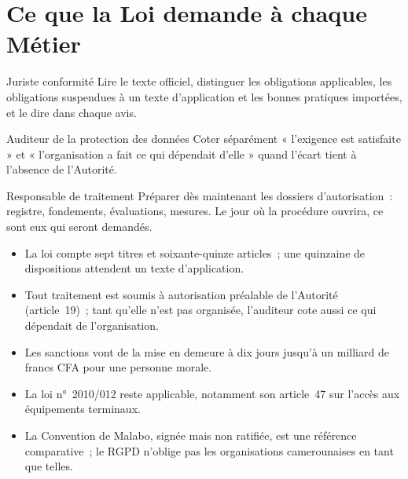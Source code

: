 \section{Ce que la Loi demande à chaque Métier}
\label{sec:c08-metiers}

\begin{boxmetier}{Juriste conformité}
Lire le texte officiel, distinguer les obligations applicables, les
obligations suspendues à un texte d'application et les bonnes pratiques
importées, et le dire dans chaque avis.
\end{boxmetier}

\begin{boxmetier}{Auditeur de la protection des données}
Coter séparément « l'exigence est satisfaite » et « l'organisation a fait ce
qui dépendait d'elle » quand l'écart tient à l'absence de l'Autorité.
\end{boxmetier}

\begin{boxmetier}{Responsable de traitement}
Préparer dès maintenant les dossiers d'autorisation~: registre, fondements,
évaluations, mesures. Le jour où la procédure ouvrira, ce sont eux qui
seront demandés.
\end{boxmetier}

\begin{boxresume}
\begin{itemize}
    \item La loi compte sept titres et soixante-quinze articles~; une
          quinzaine de dispositions attendent un texte d'application.
    \item Tout traitement est soumis à autorisation préalable de
          l'Autorité (article~19)~; tant qu'elle n'est pas organisée,
          l'auditeur cote aussi ce qui dépendait de l'organisation.
    \item Les sanctions vont de la mise en demeure à dix jours jusqu'à un
          milliard de francs CFA pour une personne morale.
    \item La loi n°~2010/012 reste applicable, notamment son article~47 sur
          l'accès aux équipements terminaux.
    \item La Convention de Malabo, signée mais non ratifiée, est une
          référence comparative~; le RGPD n'oblige pas les organisations
          camerounaises en tant que telles.
\end{itemize}
\end{boxresume}

